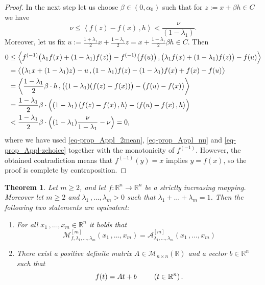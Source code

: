 \documentclass[12pt]{amsart}
\newtheorem{thm}{Theorem}%
\theoremstyle{remark}
\theoremstyle{definition}
\newcommand{\RR}{\mathbb{R}}
\newcommand{\Rn}{\mathbb{R}^n}
\newcommand{\map}{\longrightarrow}
\newcommand{\bsz}[2]{\left \langle #1 \,, #2 \right \rangle}
\begin{document}
\begin{proof}
In the next step let us choose 
$ \beta \in \left( 0 , \alpha_0 \right) $ such that 
for $ z := x + \beta h \in C $ we have 
\begin{equation}\label{eq-prop_Appl-zchoice}
\nu \leq \bsz{f(z)-f(x)}{h} < 
\frac{\nu}{\left( 1-\lambda_1 \right)}. 
\end{equation} 
Moreover, let us fix 
$ u := \frac{1+\lambda_1}{2} x + \frac{1-\lambda_1}{2} z 
= x + \frac{1-\lambda_1}{2} \beta h 
\in C $. Then 
\begin{align*}
0 & \leq 
\bsz{f^{(-1)} 
\bigl( \lambda_1 f(x) + (1-\lambda_1) f(z) \bigr) - 
f^{(-1)} \bigl( f(u) \bigr)}{ 
\bigl( \lambda_1 f(x) + (1-\lambda_1) f(z) \bigr) - f(u)} 
\\ 
& = 
\bsz{ \bigl( \lambda_1 x + (1-\lambda_1) z \bigr) - u}{ 
(1 - \lambda_1)f(z)-(1 - \lambda_1)f(x) + f(x) - f(u)} 
\\ 
& = 
\bsz{\frac{1-\lambda_1}{2} \beta \cdot h}{
\bigl( (1 - \lambda_1)(f(z)-f(x)) \bigr)
- \bigl( f(u) - f(x) \bigr)} 
\\ 
& = 
\frac{1-\lambda_1}{2} \beta \cdot 
\Bigl( (1-\lambda_1) 
\bsz{f(z)-f(x)}{h} - \bsz{f(u)-f(x)}{h} \Bigr) 
\\ 
& < 
\frac{1-\lambda_1}{2} \beta \cdot 
\Bigl( (1-\lambda_1) \frac{\nu}{1-\lambda_1} - \nu \Bigr) 
= 0, 
\end{align*}
where we have used \eqref{eq-prop_Appl_2mean}, 
\eqref{eq-prop_Appl_nu} and \eqref{eq-prop_Appl-zchoice} 
together with the monotonicity of $ f^{(-1)} $. 
However, the obtained contradiction means that 
$ f^{(-1)}(y) = x $ implies $ y = f(x) $, so the 
proof is complete by contraposition. 
\end{proof}

\begin{thm}\label{thm_Appl_vvQAMs}
Let $ m \geq 2 $, and let 
$ f : \Rn \map \Rn $ be a strictly increasing mapping. 
Moreover 
let $ m \geq 2 $ and 
$ \lambda_1 \,, \dots , \lambda_m > 0 $ 
such that 
$ \lambda_1 + \dots + \lambda_m = 1 $. 
Then the following two statements are equivalent: 
\begin{enumerate}
\item[\emph{(i)}] 
For all 
$ x_1 \,, \dots , x_m \in \Rn $ 
it holds that 
\[
\mathcal{M}_{f, \lambda_1 , \dots , \lambda_m}^{[m]} 
\left( x_1 \,, \dots , x_m \right)
= \mathcal{A}_{\lambda_1 , \dots , \lambda_m}^{[m]} 
\left( x_1 \,, \dots , x_m \right)
\] 
\item[\emph{(ii)}]
There exist a positive definite matrix 
$ A \in \mathcal{M}_{n \times n}(\RR) $ and a vector 
$ b \in \Rn $ such that 
\[
f(t) = At + b 
\hspace{8mm} 
\left( t \in \Rn \right). 
\]
\end{enumerate}
\end{thm}
\end{document}
